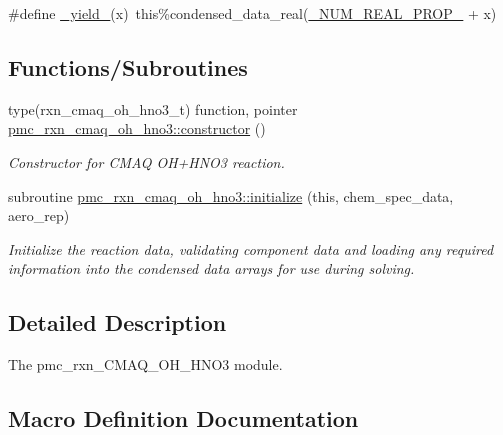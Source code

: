 \begin{DoxyCompactItemize}
\item 
\#define \mbox{\hyperlink{rxn___c_m_a_q___o_h___h_n_o3_8_f90_a767b378bc7f42ea6f251cd44b8bc09da}{\+\_\+yield\+\_\+}}(x)~this\%condensed\+\_\+data\+\_\+real(\mbox{\hyperlink{sub__model___u_n_i_f_a_c_8_f90_a242fac7fe42c0d62936c65735dc023a6}{\+\_\+\+N\+U\+M\+\_\+\+R\+E\+A\+L\+\_\+\+P\+R\+O\+P\+\_\+}} + x)
\end{DoxyCompactItemize}
\subsection*{Functions/\+Subroutines}
\begin{DoxyCompactItemize}
\item 
type(rxn\+\_\+cmaq\+\_\+oh\+\_\+hno3\+\_\+t) function, pointer \mbox{\hyperlink{namespacepmc__rxn__cmaq__oh__hno3_ac46f8091219be3c798ab6b7fb46aa2df}{pmc\+\_\+rxn\+\_\+cmaq\+\_\+oh\+\_\+hno3\+::constructor}} ()
\begin{DoxyCompactList}\small\item\em Constructor for C\+M\+AQ O\+H+\+H\+N\+O3 reaction. \end{DoxyCompactList}\item 
subroutine \mbox{\hyperlink{namespacepmc__rxn__cmaq__oh__hno3_aa017d117b8160d6df85e72882a738e69}{pmc\+\_\+rxn\+\_\+cmaq\+\_\+oh\+\_\+hno3\+::initialize}} (this, chem\+\_\+spec\+\_\+data, aero\+\_\+rep)
\begin{DoxyCompactList}\small\item\em Initialize the reaction data, validating component data and loading any required information into the condensed data arrays for use during solving. \end{DoxyCompactList}\end{DoxyCompactItemize}


\subsection{Detailed Description}
The pmc\+\_\+rxn\+\_\+\+C\+M\+A\+Q\+\_\+\+O\+H\+\_\+\+H\+N\+O3 module. 



\subsection{Macro Definition Documentation}
\mbox{\label{rxn___c_m_a_q___o_h___h_n_o3_8_f90_a8d22506f8671e195690022c44d319caf}} 
